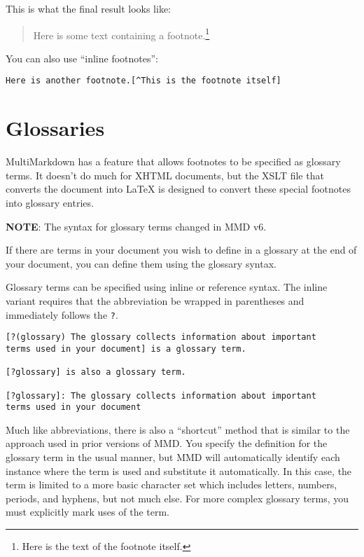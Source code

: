 This is what the final result looks like:

\begin{quote}
Here is some text containing a footnote.\footnote{Here is the text of the footnote itself.}
\end{quote}

You can also use ``inline footnotes'':

\begin{verbatim}
Here is another footnote.[^This is the footnote itself]
\end{verbatim}

\section{Glossaries}
\label{glossaries}

MultiMarkdown has a feature that allows footnotes to be specified as glossary terms. It doesn't do much for XHTML documents, but the XSLT file that converts the document into LaTeX is designed to convert these special footnotes into glossary entries.

\textbf{NOTE}: The syntax for glossary terms changed in \gls{MMD} v6.

If there are terms in your document you wish to define in a \gls{glossary} at the end of your document, you can define them using the glossary syntax.

Glossary terms can be specified using inline or reference syntax. The inline variant requires that the abbreviation be wrapped in parentheses and immediately follows the \texttt{?}.

\begin{verbatim}
[?(glossary) The glossary collects information about important
terms used in your document] is a glossary term.

[?glossary] is also a glossary term.

[?glossary]: The glossary collects information about important
terms used in your document
\end{verbatim}

Much like abbreviations, there is also a ``shortcut'' method that is similar to the approach used in prior versions of \gls{MMD}. You specify the definition for the glossary term in the usual manner, but \gls{MMD} will automatically identify each instance where the term is used and substitute it automatically. In this case, the term is limited to a more basic character set which includes letters, numbers, periods, and hyphens, but not much else. For more complex glossary terms, you must explicitly mark uses of the term.

